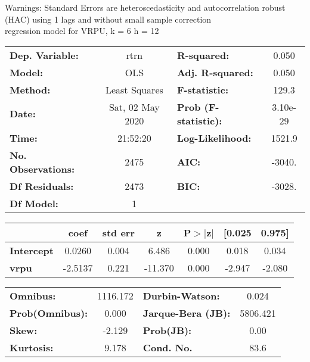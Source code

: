 Warnings: \newline
 [1] Standard Errors are heteroscedasticity and autocorrelation robust (HAC) using 1 lags and without small sample correction\\ 

regression model for VRPU, k = 6 h = 12\begin{center}
\begin{tabular}{lclc}
\toprule
\textbf{Dep. Variable:}    &       rtrn       & \textbf{  R-squared:         } &     0.050   \\
\textbf{Model:}            &       OLS        & \textbf{  Adj. R-squared:    } &     0.050   \\
\textbf{Method:}           &  Least Squares   & \textbf{  F-statistic:       } &     129.3   \\
\textbf{Date:}             & Sat, 02 May 2020 & \textbf{  Prob (F-statistic):} &  3.10e-29   \\
\textbf{Time:}             &     21:52:20     & \textbf{  Log-Likelihood:    } &    1521.9   \\
\textbf{No. Observations:} &        2475      & \textbf{  AIC:               } &    -3040.   \\
\textbf{Df Residuals:}     &        2473      & \textbf{  BIC:               } &    -3028.   \\
\textbf{Df Model:}         &           1      & \textbf{                     } &             \\
\bottomrule
\end{tabular}
\begin{tabular}{lcccccc}
                   & \textbf{coef} & \textbf{std err} & \textbf{z} & \textbf{P$> |$z$|$} & \textbf{[0.025} & \textbf{0.975]}  \\
\midrule
\textbf{Intercept} &       0.0260  &        0.004     &     6.486  &         0.000        &        0.018    &        0.034     \\
\textbf{vrpu}      &      -2.5137  &        0.221     &   -11.370  &         0.000        &       -2.947    &       -2.080     \\
\bottomrule
\end{tabular}
\begin{tabular}{lclc}
\textbf{Omnibus:}       & 1116.172 & \textbf{  Durbin-Watson:     } &    0.024  \\
\textbf{Prob(Omnibus):} &   0.000  & \textbf{  Jarque-Bera (JB):  } & 5806.421  \\
\textbf{Skew:}          &  -2.129  & \textbf{  Prob(JB):          } &     0.00  \\
\textbf{Kurtosis:}      &   9.178  & \textbf{  Cond. No.          } &     83.6  \\
\bottomrule
\end{tabular}
\end{center}

